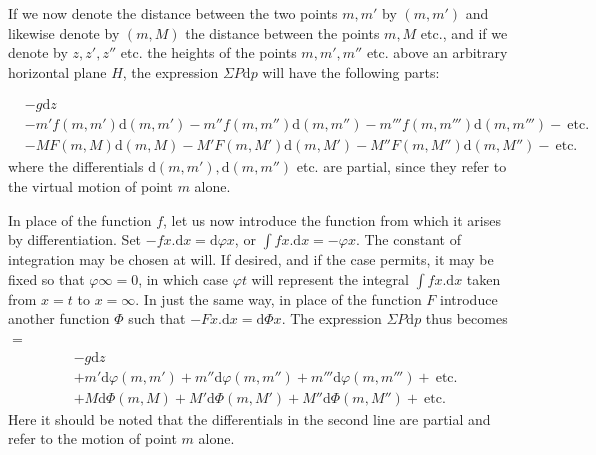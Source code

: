 If we now denote the distance between the two points $m,m'$ by $(m,m')$ and likewise denote by $(m,M)$ the distance between the points $m,M$ etc., and if we denote by $z,z',z''$ etc. the heights of the points $m,m',m''$ etc. above an arbitrary horizontal plane $H$, the expression $\Sigma P\mathrm{d}p$ will have the following parts:
\par\begingroup\small
\[
\begin{aligned}
&-g\mathrm{d}z\\
&-m'f(m,m')\mathrm{d}(m,m')-m''f(m,m'')\mathrm{d}(m,m'')-m'''f(m,m''')\mathrm{d}(m,m''')-\ \text{etc.}\\
&-MF(m,M)\mathrm{d}(m,M)-M'F(m,M')\mathrm{d}(m,M')-M''F(m,M'')\mathrm{d}(m,M'')-\ \text{etc.}
\end{aligned}
\]
\endgroup
where the differentials $\mathrm{d}(m,m'),\mathrm{d}(m,m'')$ etc. are partial, since they refer to the virtual motion of point $m$ alone.

In place of the function $f$, let us now introduce the function from which it arises by differentiation. Set $-fx.\mathrm{d}x=\mathrm{d}\varphi x$, or $\int fx.\mathrm{d}x=-\varphi x$. The constant of integration may be chosen at will. If desired, and if the case permits, it may be fixed so that $\varphi\infty=0$, in which case $\varphi t$ will represent the integral $\int fx.\mathrm{d}x$ taken from $x=t$ to $x=\infty$. In just the same way, in place of the function $F$ introduce another function $\Phi$ such that $-Fx.\mathrm{d}x=\mathrm{d}\Phi x$. The expression $\Sigma P\mathrm{d}p$ thus becomes $=$
\[
\begin{aligned}
&-g\mathrm{d}z\\
&+m'\mathrm{d}\varphi(m,m')+m''\mathrm{d}\varphi(m,m'')+m'''\mathrm{d}\varphi(m,m''')+\ \text{etc.}\\
&+M\mathrm{d}\Phi(m,M)+M'\mathrm{d}\Phi(m,M')+M''\mathrm{d}\Phi(m,M'')+\ \text{etc.}
\end{aligned}
\]
Here it should be noted that the differentials in the second line are partial and refer to the motion of point $m$ alone.

